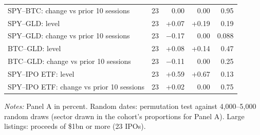 \begin{table}[!htbp]
{\begin{threeparttable}
\begin{tabular}{lrrrr}
\quad SPY--BTC: change vs prior 10 sessions & 23 & 0.00 & 0.00 & 0.95 \\
\quad SPY--GLD: level & 23 & +0.07 & +0.19 & 0.19 \\
\quad SPY--GLD: change vs prior 10 sessions & 23 & $-$0.17 & 0.00 & 0.088 \\
\quad BTC--GLD: level & 23 & +0.08 & +0.14 & 0.47 \\
\quad BTC--GLD: change vs prior 10 sessions & 23 & $-$0.11 & 0.00 & 0.25 \\
\quad SPY--IPO ETF: level & 23 & +0.59 & +0.67 & 0.13 \\
\quad SPY--IPO ETF: change vs prior 10 sessions & 23 & +0.02 & 0.00 & 0.75 \\
\bottomrule
\end{tabular}
\begin{tablenotes}[flushleft]\footnotesize
\item \textit{Notes:} Panel A in percent. Random dates: permutation test against 4,000--5,000 random draws (sector drawn in the cohort's proportions for Panel A). Large listings: proceeds of \$1bn or more (23 IPOs).
\end{tablenotes}
\end{threeparttable}
}
\end{table}
